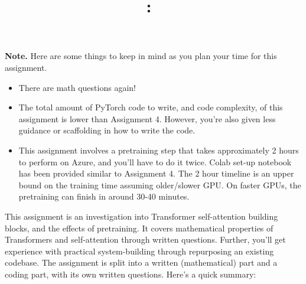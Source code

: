 \documentclass[answers]{exam}
\title{
\textmd{\textbf{\hmwkClass:\ \hmwkTitle}}
}
\author{}
\date{}
\begin{document}
\vspace{-1in}

\maketitle

\vspace{-0.5in}


\begin{framed}
\noindent
 \textbf{Note.} Here are some things to keep in mind as you plan your time for this assignment.
\begin{itemize}
   \item There are math questions again!
   \item The total amount of PyTorch code to write, and code complexity, of this assignment is lower than Assignment 4. 
         However, you're also given less guidance or scaffolding in how to write the code.
         \item  This assignment involves a pretraining step that takes approximately 2 hours to perform on Azure, and you'll have to do it twice. Colab set-up notebook has been provided similar to Assignment 4. The 2 hour timeline is an upper bound on the training time assuming older/slower GPU. On faster GPUs, the pretraining can finish in around 30-40 minutes.
\end{itemize}

\end{framed}
This assignment is an investigation into Transformer self-attention building blocks, and the effects of pretraining.
It covers mathematical properties of Transformers and self-attention through written questions.
Further, you'll get experience with practical system-building through repurposing an existing codebase.
The assignment is split into a written (mathematical) part and a coding part, with its own written questions.
Here's a quick summary:
\end{document}
